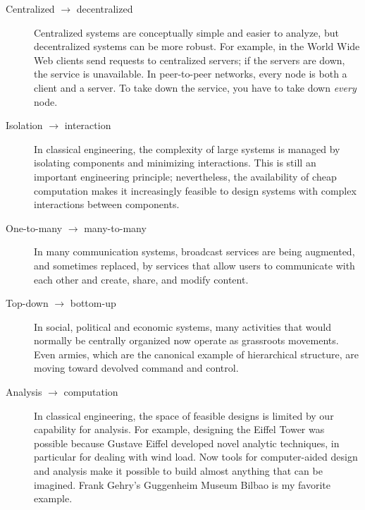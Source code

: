 \documentclass[12pt]{book}
\theoremstyle{exercise}
\begin{document}
\begin{description}

\item[Centralized $\rightarrow$ decentralized] Centralized systems are
  conceptually simple and easier to analyze, but decentralized systems
  can be more robust.  For example, in the World Wide Web clients send
  requests to centralized servers; if the servers are down, the
  service is unavailable.  In peer-to-peer networks, every node is
  both a client and a server.  To take down the service, you have to
  take down {\em every} node.


\item[Isolation $\rightarrow$ interaction] In classical engineering,
  the complexity of large systems is managed by isolating components
  and minimizing interactions.  This is still an important engineering
  principle; nevertheless, the availability of cheap computation makes
  it increasingly feasible to design systems with complex interactions
  between components.


\item[One-to-many $\rightarrow$ many-to-many] In many communication
  systems, broadcast services are being augmented, and sometimes
  replaced, by services that allow users to communicate with each
  other and create, share, and modify content.


\item[Top-down $\rightarrow$ bottom-up] In social, political and
  economic systems, many activities that would normally be centrally
  organized now operate as grassroots movements.  Even armies, which
  are the canonical example of hierarchical structure, are moving
  toward devolved command and control.


\item[Analysis $\rightarrow$ computation] In classical engineering,
  the space of feasible designs is limited by our capability for
  analysis.  For example, designing the Eiffel Tower was possible
  because Gustave Eiffel developed novel analytic techniques, in
  particular for dealing with wind load.  Now tools for computer-aided
  design and analysis make it possible to build almost anything that
  can be imagined.  Frank Gehry's Guggenheim Museum Bilbao is my
  favorite example.


\end{description}
\end{document}
